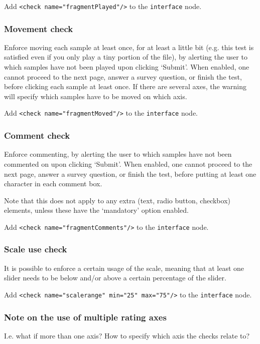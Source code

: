 \documentclass[11pt, oneside]{article}   	%
\begin{document}
				Add \texttt{<check name="fragmentPlayed"/>} to the \texttt{interface} node. 
				

		\subsubsection{Movement check}
			Enforce moving each sample at least once, for at least a little bit (e.g. this test is satisfied even if you only play a tiny portion of the file), by alerting the user to which samples have not been played upon clicking `Submit'. When enabled, one cannot proceed to the next page, answer a survey question, or finish the test, before clicking each sample at least once. 
			If there are several axes, the warning will specify which samples have to be moved on which axis.

			Add \texttt{<check name="fragmentMoved"/>} to the \texttt{interface} node.

		\subsubsection{Comment check}

			Enforce commenting, by alerting the user to which samples have not been commented on upon clicking `Submit'. When enabled, one cannot proceed to the next page, answer a survey question, or finish the test, before putting at least one character in each comment box. 

			Note that this does not apply to any extra (text, radio button, checkbox) elements, unless these have the `mandatory' option enabled. %

			Add \texttt{<check name="fragmentComments"/>} to the \texttt{interface} node. 


		\subsubsection{Scale use check}
			It is possible to enforce a certain usage of the scale, meaning that at least one slider needs to be below and/or above a certain percentage of the slider. 

			Add \texttt{<check name="scalerange" min="25" max="75"/>} to the \texttt{interface} node. 

		\subsubsection{Note on the use of multiple rating axes}
			I.e. what if more than one axis? How to specify which axis the checks relate to? %
\end{document}
